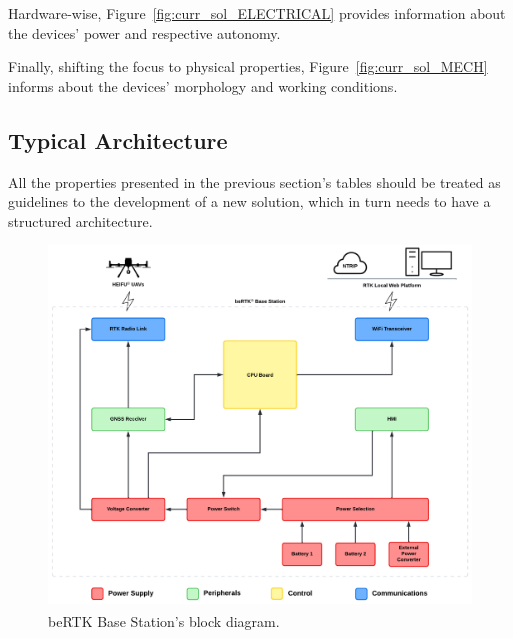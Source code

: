 Hardware-wise, Figure~\ref{fig:curr_sol_ELECTRICAL} provides information about the devices' power and respective autonomy.

Finally, shifting the focus to physical properties, Figure~\ref{fig:curr_sol_MECH} informs about the devices' morphology and working conditions.

\subsection{Typical Architecture}\label{sec:II_architecture}

All the properties presented in the previous section's tables should be treated as guidelines to the development of a new solution, which in turn needs to have a structured architecture.

\begin{figure}[ht]
	\centering
	\includegraphics[width=1.0\textwidth]{Chapters/Figures/architecture_original_v2.pdf}
	\caption{beRTK\textsuperscript{\textregistered} Base Station's block diagram.}
	\label{fig:architecture_original}
\end{figure}

